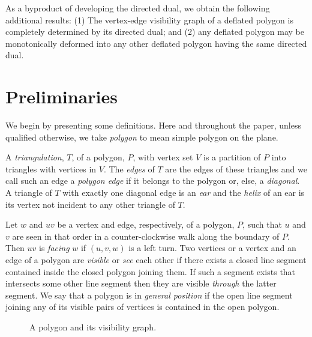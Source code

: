 \documentclass{amsart}
\begin{document}
As a byproduct of developing the directed dual, we obtain the
following additional results: (1) The vertex-edge visibility graph of
a deflated polygon is completely determined by its directed dual; and
(2) any deflated polygon may be monotonically deformed into any other
deflated polygon having the same directed dual.

\fi


\section{Preliminaries}

We begin by presenting some definitions.  Here and throughout the
paper, unless qualified otherwise, we take \emph{polygon} to mean
simple polygon on the plane.

A \emph{triangulation}, $T$, of a polygon, $P$, with vertex set $V$ is
a partition of $P$ into triangles with vertices in $V$.  The
\emph{edges} of $T$ are the edges of these triangles and we call such
an edge a \emph{polygon edge} if it belongs to the polygon or, else, a
\emph{diagonal}.  A triangle of $T$ with exactly one diagonal edge is
an \emph{ear} and the \emph{helix} of an ear is its vertex not
incident to any other triangle of $T$.


Let $w$ and $uv$ be a vertex and edge, respectively, of a polygon,
$P$, such that $u$ and $v$ are seen in that order in a
counter-clockwise walk along the boundary of $P$.  Then $uv$
is \emph{facing} $w$ if $(u,v,w)$ is a left turn.  Two vertices or a
vertex and an edge of a polygon are \emph{visible} or \emph{see} each
other if there exists a closed line segment contained inside the
closed polygon joining them.  If such a segment exists that intersects
some other line segment then they are visible \emph{through} the
latter segment.  We say that a polygon is in \emph{general position}
if the open line segment joining any of its visible pairs of vertices
is contained in the open polygon.

\begin{figure}[htb]
  \centering
  \quad
  \caption{\protect{} A polygon
    and \protect{} its visibility graph.}
  \label{fig:vv-vis-graph}
\end{figure}
\end{document}
